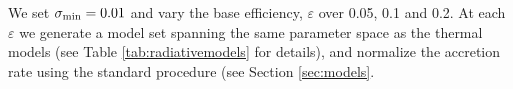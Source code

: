 We set $\sigma_{\rm min}=0.01$ and vary the base efficiency, $\varepsilon$ over 0.05, 0.1 and 0.2.  At each $\varepsilon$ we generate a model set spanning the same parameter space as the thermal models (see Table \ref{tab:radiativemodels} for details),
and normalize the accretion rate using the standard procedure (see Section \ref{sec:models}.



